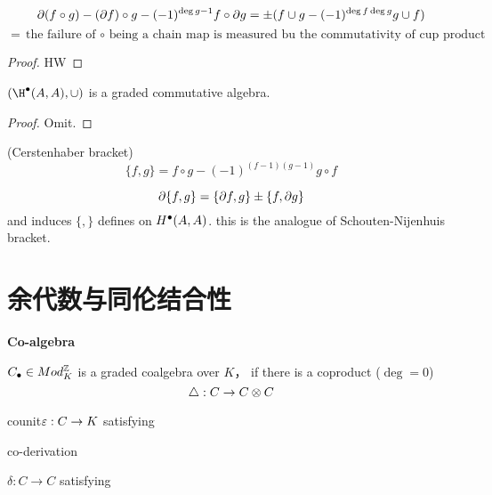 \begin{prop}
$$\partial(f\circ g)-(\partial f)\circ g-(-1)^{\deg g-1}f\circ\partial g
=\pm(f\cup g-(-1)^{\deg f\deg g}g\cup f)$$
$$=\text{the failure of $\circ$ being a chain map
is measured bu the commutativity of cup product}$$
\end{prop}

\begin{proof}
HW
\end{proof}

\begin{cor}
$(\H\updot(A,A),\cup)$ is a graded commutative algebra.
\end{cor}

\begin{proof}
Omit.
\end{proof}


\begin{definition}(Cerstenhaber bracket)
$$\{f,g\}=f\circ g-(-1)^{(f-1)(g-1)}g\circ f$$
\end{definition}

\begin{prop}
$$\partial\{f,g\}=\{\partial f,g\}\pm\{f,\partial g\}$$
and induces
$\{,\}$ defines on $H^{\bullet}(A,A)$.
this is  the analogue of Schouten-Nijenhuis bracket.
\end{prop}



\section{余代数与同伦结合性}

\textbf{Co-algebra}

\begin{definition}
$C_{\bullet}\in Mod_K^{\mathbb{Z}}$ is a graded coalgebra over $K$，
if there is a coproduct ($\deg=0$)
$$\triangle:C\to C\otimes C$$
\end{definition}

counit$\varepsilon:C\to K$ satisfying

co-derivation

$\delta: C\to C$ satisfying

